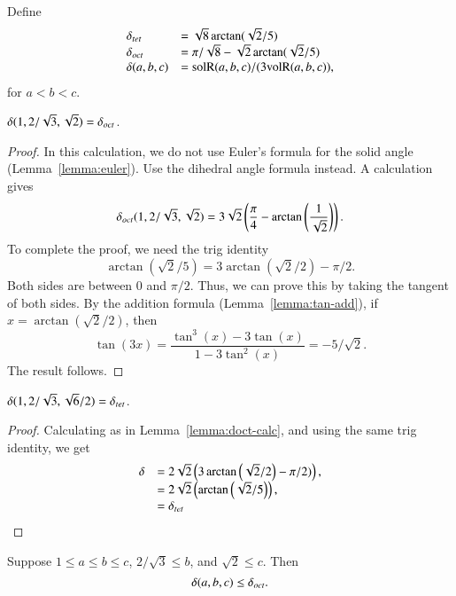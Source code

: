 \begin{definition}  Define 
  $$
  \begin{array}{lll}
  \delta_{tet} &= \sqrt8 \arctan(\sqrt2/5)\\
  \delta_{oct} &= \pi/\sqrt8 - \sqrt2 \arctan(\sqrt2/5)\\
  \delta(a,b,c)&= {\operatorname{solR}}(a,b,c)/(3{\operatorname{volR}}(a,b,c)),
  \end{array}
  $$
for $a<b<c$.  
\end{definition}

\begin{lemma}
  $\delta(1,2/\sqrt{3},\sqrt2)=\delta_{oct}$.
\end{lemma}

\begin{proof}  In this calculation, we do not use Euler's formula
for the solid angle (Lemma~\ref{lemma:euler}).  
Use the dihedral angle formula instead.
A calculation gives
  $$
  \delta_{oct}(1,2/\sqrt{3},\sqrt2)=
  3 \sqrt{2} \left(\frac{\pi }{4}-\arctan
   \left(\frac{1}{\sqrt{2}}\right)\right).$$
To complete the proof, we need the trig identity
  $$\arctan(\sqrt2/5)  = 3\arctan(\sqrt2/2)-\pi/2.$$
Both sides are between $0$ and $\pi/2$.  Thus, we can prove this
by taking the tangent of both sides. By the addition formula
(Lemma~\ref{lemma:tan-add}),
if $x=\arctan(\sqrt2/2)$, then
   $$\tan(3 x) = \frac{\tan^3(x) - 3\tan(x)}{1-3 \tan^2(x)} = -5/\sqrt2.$$
The result follows.
\end{proof}

\begin{lemma}
  $\delta(1,2/\sqrt3,\sqrt6/2)=\delta_{tet}$.
\end{lemma}

\begin{proof} Calculating as in Lemma~\ref{lemma:doct-calc}, and using
the same trig identity, we get
$$\begin{array}{lll}
  \delta &=
2\sqrt{2} \left(3\arctan\left(\sqrt2/2\right) - \pi/2)\right),\\
  &=2\sqrt{2}\left(\arctan\left(\sqrt2/5\right)\right),\\
  &=\delta_{tet}
\end{array}
$$
\end{proof}

\begin{lemma}
Suppose $1\le a\le  b\le c$,  $2/\sqrt{3}\le b$, and $\sqrt2\le c$.  Then
$$
\delta(a,b,c) \le \delta_{oct}.
$$
\end{lemma}

